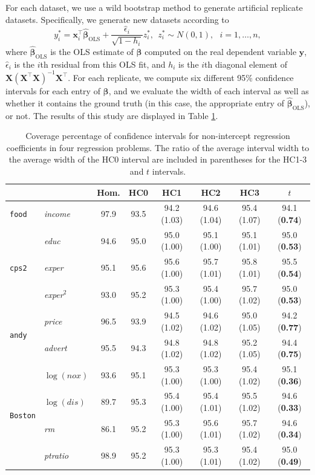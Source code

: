 \documentclass[12pt]{article}
\newcommand{\bl}[1]{{\mathbf #1}}
\newcommand{\bs}[1]{\boldsymbol #1}
\begin{document}
For each dataset, we use a wild bootstrap method to generate artificial replicate datasets. Specifically, we generate new datasets according to
\begin{equation*}
    y^*_i = \bl{x}_i^\top\hat{\bs{\beta}}_{\mathrm{OLS}} + \frac{\hat{\epsilon}_i}{\sqrt{1 - h_i}} z^*_i,~~z_i^* \sim N(0, 1),~~~i = 1, \dots, n,
\end{equation*}
where $\hat{\bs{\beta}}_{\mathrm{OLS}}$ is the OLS estimate of $\bs{\beta}$ computed on the real dependent variable $\bs{y}$, $\hat{\epsilon}_i$ is the $i$th residual from this OLS fit, and $h_i$ is the $i$th diagonal element of $\bl{X}(\bl{X}^\top \bl{X})^{-1} \bl{X}^\top$. For each replicate, we compute six different 95\% confidence intervals for each entry of $\bs{\beta}$, and we evaluate the width of each interval as well as whether it contains the ground truth (in this case, the appropriate entry of $\hat{\bs{\beta}}_{\mathrm{OLS}}$), or not. The results of this study are displayed in Table \ref{tab:coverage}.

\begin{table}\centering
\begin{tabular}{@{}llcccccc@{}}\toprule
& & Hom. & HC0 & HC1 & HC2 & HC3 & $t$ \\ \midrule
\texttt{food} & \textit{income} & 97.9 & 93.5 & 94.2 (1.03) & 94.6 (1.04) & 95.4 (1.07) & 94.1 (\textbf{0.74}) \\ \midrule
& \textit{educ} & 94.6 & 95.0 & 95.0 (1.00) & 95.1 (1.00) & 95.1 (1.01) & 95.0 (\textbf{0.53}) \\
\texttt{cps2} & \textit{exper} & 95.1 & 95.6 & 95.6 (1.00) & 95.7 (1.01) & 95.8 (1.01) & 95.5 (\textbf{0.54}) \\
& \textit{exper}$^2$ & 93.0 & 95.2 & 95.3 (1.00) & 95.4 (1.00) & 95.7 (1.02) & 95.0 (\textbf{0.53})  \\\midrule
\multirow{2}{*}{\texttt{andy}}& \textit{price} & 96.5 & 93.9 & 94.5 (1.02) & 94.6 (1.02) & 95.0 (1.05) & 94.2 (\textbf{0.77}) \\
& \textit{advert} & 95.5 & 94.3 & 94.8 (1.02) & 94.8 (1.02) & 95.2 (1.05) & 94.4 (\textbf{0.75}) \\
\midrule
& $\log(\textit{nox})$ & 93.6 & 95.1 & 95.3 (1.00) & 95.3 (1.00) & 95.4 (1.02) & 95.1 (\textbf{0.36})\\
\multirow{2}{*}{\texttt{Boston}}& $\log(\textit{dis})$ & 89.7 & 95.3 & 95.4 (1.00) & 95.4 (1.01) & 95.5 (1.02) & 94.6 (\textbf{0.33}) \\
& \textit{rm} & 86.1 & 95.2 & 95.3 (1.00) & 95.6 (1.01) & 95.7 (1.02) & 94.6 (\textbf{0.34}) \\
& \textit{ptratio} & 98.9 & 95.2 & 95.3 (1.00) & 95.3 (1.01) & 95.4 (1.02) & 95.0 (\textbf{0.49}) \\
\bottomrule
\end{tabular}
\caption{Coverage percentage of confidence intervals for non-intercept regression coefficients in four regression problems. The ratio of the average interval width to the average width of the HC0 interval are included in parentheses for the HC1-3 and $t$ intervals.}
\label{tab:coverage}
\end{table}
\end{document}
